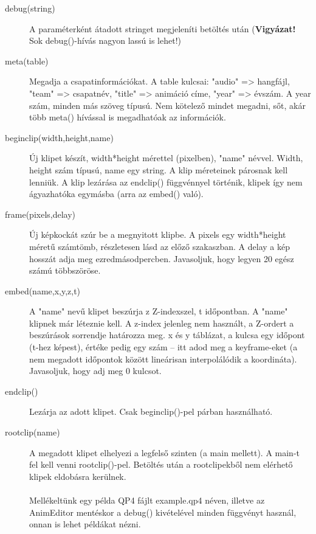 \documentclass[a4paper,12pt,release]{article}
\begin{document}
\begin{description}
\item[debug(string)]A paraméterként átadott stringet megjeleníti betöltés után ({\bf Vigyázat!} Sok debug()-hívás nagyon lassú is lehet!)
\item[meta(table)]Megadja a csapatinformációkat. A table kulcsai: "audio" => hangfájl, "team" => csapatnév, "title" => animáció címe, "year" => évszám. A year szám, minden más szöveg típusú. Nem kötelező mindet megadni, sőt, akár több meta() hívással is megadhatóak az információk.
\item[beginclip(width,height,name)]Új klipet készít, width*height mérettel (pixelben), "name" névvel. Width, height szám típusú, name egy string. A klip méreteinek párosnak kell lenniük. A klip lezárása az endclip() függvénnyel történik, klipek így nem ágyazhatóka egymásba (arra az embed() való).
\item[frame(pixels,delay)]Új képkockát szúr be a megnyitott klipbe. A pixels egy width*height méretű számtömb, részletesen lásd az előző szakaszban. A delay a kép hosszát adja meg ezredmásodpercben. Javasoljuk, hogy legyen 20 egész számú többszöröse.
\item[embed(name,x,y,z,t)]A "name" nevű klipet beszúrja z Z-indexszel, t időpontban. A "name" klipnek már léteznie kell. A z-index jelenleg nem használt, a Z-ordert a beszúrások sorrendje határozza meg. x és y táblázat, a kulcsa egy időpont (t-hez képest), értéke pedig egy szám -- itt adod meg a keyframe-eket (a nem megadott időpontok között lineárisan interpolálódik a koordináta). Javasoljuk, hogy adj meg 0 kulcsot.
\item[endclip()]Lezárja az adott klipet. Csak beginclip()-pel párban használható.
\item[rootclip(name)]A megadott klipet elhelyezi a legfelső szinten (a main mellett). A main-t fel kell venni rootclip()-pel. Betöltés után a rootclipekből nem elérhető klipek eldobásra kerülnek.
\\\\
Mellékeltünk egy példa QP4 fájlt example.qp4 néven, illetve az AnimEditor mentéskor a debug() kivételével minden függvényt használ, onnan is lehet példákat nézni.
\end{description}
\end{document}
